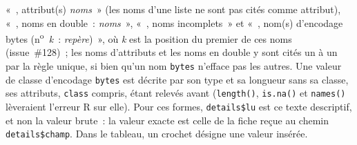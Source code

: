 \documentclass[a4paper,11pt]{article}
\newcommand{\code}[1]{\texttt{\small #1}}
\begin{document}
«~, attribut(s) \emph{noms}~» (les noms d'une liste ne sont pas cités comme
attribut), «~, noms en double~: \emph{noms}~», «~, noms incomplets~» et
«~, nom(s) d'encodage bytes (n\textsuperscript{o}~\emph{k}~:
\emph{repère})~», où \emph{k} est la position du premier de ces noms
(issue~\#128)~; les noms d'attributs et les noms en double y sont cités un
à un par la règle unique, si bien qu'un nom \code{bytes} n'efface pas les
autres. Une valeur de classe d'encodage \code{bytes} est décrite par son
type et sa longueur sans sa classe, ses attributs, \code{class} compris,
étant relevés avant (\code{length()}, \code{is.na()} et \code{names()}
lèveraient l'erreur R sur elle). Pour ces formes, \code{details\$lu} est ce texte descriptif, et
non la valeur brute~: la valeur exacte est celle de la fiche reçue au
chemin \code{details\$champ}.
Dans le tableau, un crochet désigne une valeur insérée.
\end{document}
